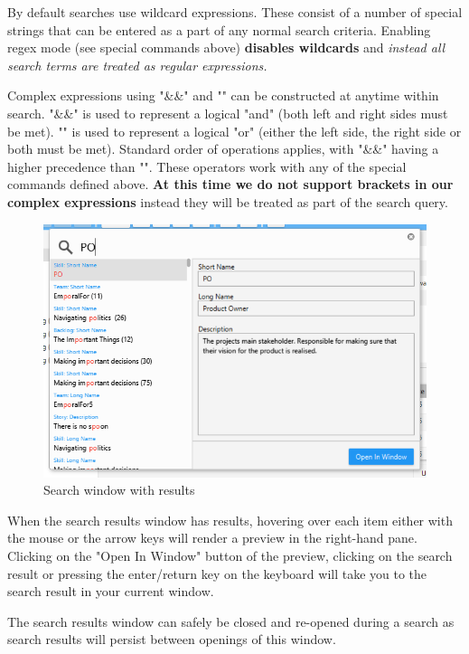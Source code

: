By default searches use wildcard expressions. These consist of a number of special strings that can be entered as a part of any normal search criteria.
Enabling regex mode (see special commands above) {\bf disables wildcards} and {\it instead all search terms are treated as regular expressions.}\newline


Complex expressions using "\&\&" and "\text{\textbar}\text{\textbar}" can be constructed at anytime within search. "\&\&" is used to represent a logical "and" (both left and right sides must be met). "\text{\textbar}\text{\textbar}" is used to represent a logical "or" (either the left side, the right side or both must be met).\newline
Standard order of operations applies, with "\&\&" having a higher precedence than "\text{\textbar}\text{\textbar}". These operators work with any of the special commands defined above.\newline
{\bf At this time we do not support brackets in our complex expressions} instead they will be treated as part of the search query.

\begin{figure}[H]
\centering
\includegraphics[width=\textwidth]{images/screenshots/search3.PNG}
\caption{Search window with results}
\label{fig:search_window_results}
\end{figure}

When the search results window has results, hovering over each item either with the mouse or the arrow keys will render a preview in the right-hand pane. Clicking on the "Open In Window" button of the preview, clicking on the search result or pressing the enter/return key on the keyboard will take you to the search result in your current window.

The search results window can safely be closed and re-opened during a search as search results will persist between openings of this window.